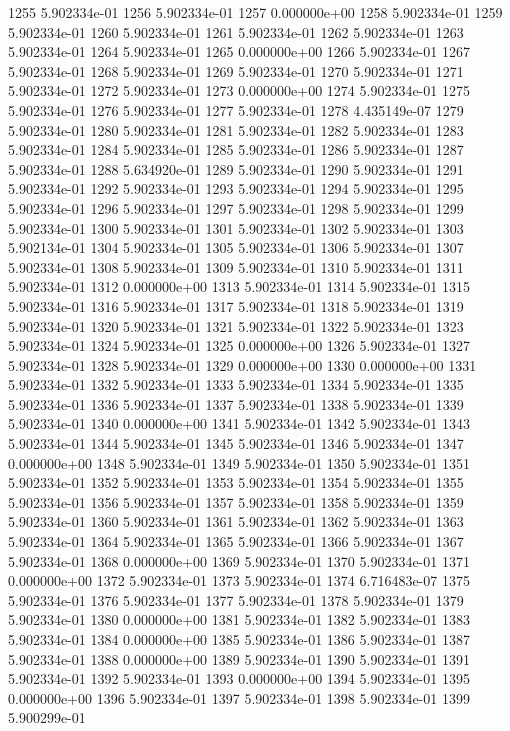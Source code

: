 \documentclass{article}
\begin{document}
\begin{Schunk}
\begin{Soutput}
1255 5.902334e-01
1256 5.902334e-01
1257 0.000000e+00
1258 5.902334e-01
1259 5.902334e-01
1260 5.902334e-01
1261 5.902334e-01
1262 5.902334e-01
1263 5.902334e-01
1264 5.902334e-01
1265 0.000000e+00
1266 5.902334e-01
1267 5.902334e-01
1268 5.902334e-01
1269 5.902334e-01
1270 5.902334e-01
1271 5.902334e-01
1272 5.902334e-01
1273 0.000000e+00
1274 5.902334e-01
1275 5.902334e-01
1276 5.902334e-01
1277 5.902334e-01
1278 4.435149e-07
1279 5.902334e-01
1280 5.902334e-01
1281 5.902334e-01
1282 5.902334e-01
1283 5.902334e-01
1284 5.902334e-01
1285 5.902334e-01
1286 5.902334e-01
1287 5.902334e-01
1288 5.634920e-01
1289 5.902334e-01
1290 5.902334e-01
1291 5.902334e-01
1292 5.902334e-01
1293 5.902334e-01
1294 5.902334e-01
1295 5.902334e-01
1296 5.902334e-01
1297 5.902334e-01
1298 5.902334e-01
1299 5.902334e-01
1300 5.902334e-01
1301 5.902334e-01
1302 5.902334e-01
1303 5.902134e-01
1304 5.902334e-01
1305 5.902334e-01
1306 5.902334e-01
1307 5.902334e-01
1308 5.902334e-01
1309 5.902334e-01
1310 5.902334e-01
1311 5.902334e-01
1312 0.000000e+00
1313 5.902334e-01
1314 5.902334e-01
1315 5.902334e-01
1316 5.902334e-01
1317 5.902334e-01
1318 5.902334e-01
1319 5.902334e-01
1320 5.902334e-01
1321 5.902334e-01
1322 5.902334e-01
1323 5.902334e-01
1324 5.902334e-01
1325 0.000000e+00
1326 5.902334e-01
1327 5.902334e-01
1328 5.902334e-01
1329 0.000000e+00
1330 0.000000e+00
1331 5.902334e-01
1332 5.902334e-01
1333 5.902334e-01
1334 5.902334e-01
1335 5.902334e-01
1336 5.902334e-01
1337 5.902334e-01
1338 5.902334e-01
1339 5.902334e-01
1340 0.000000e+00
1341 5.902334e-01
1342 5.902334e-01
1343 5.902334e-01
1344 5.902334e-01
1345 5.902334e-01
1346 5.902334e-01
1347 0.000000e+00
1348 5.902334e-01
1349 5.902334e-01
1350 5.902334e-01
1351 5.902334e-01
1352 5.902334e-01
1353 5.902334e-01
1354 5.902334e-01
1355 5.902334e-01
1356 5.902334e-01
1357 5.902334e-01
1358 5.902334e-01
1359 5.902334e-01
1360 5.902334e-01
1361 5.902334e-01
1362 5.902334e-01
1363 5.902334e-01
1364 5.902334e-01
1365 5.902334e-01
1366 5.902334e-01
1367 5.902334e-01
1368 0.000000e+00
1369 5.902334e-01
1370 5.902334e-01
1371 0.000000e+00
1372 5.902334e-01
1373 5.902334e-01
1374 6.716483e-07
1375 5.902334e-01
1376 5.902334e-01
1377 5.902334e-01
1378 5.902334e-01
1379 5.902334e-01
1380 0.000000e+00
1381 5.902334e-01
1382 5.902334e-01
1383 5.902334e-01
1384 0.000000e+00
1385 5.902334e-01
1386 5.902334e-01
1387 5.902334e-01
1388 0.000000e+00
1389 5.902334e-01
1390 5.902334e-01
1391 5.902334e-01
1392 5.902334e-01
1393 0.000000e+00
1394 5.902334e-01
1395 0.000000e+00
1396 5.902334e-01
1397 5.902334e-01
1398 5.902334e-01
1399 5.900299e-01

\end{Soutput}
\end{Schunk}
\end{document}
